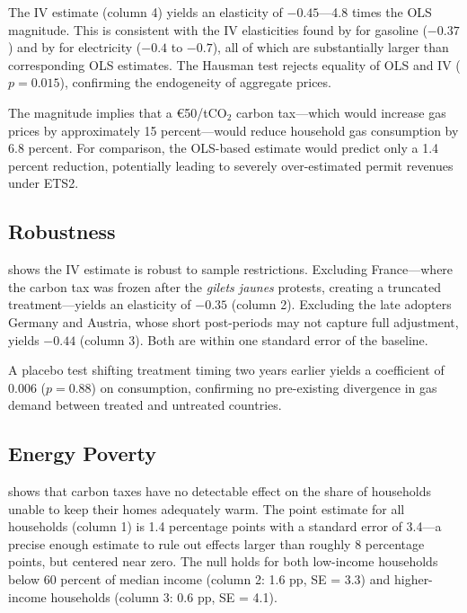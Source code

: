\documentclass[12pt]{article}
\begin{document}
The IV estimate (column 4) yields an elasticity of $-0.45$---4.8 times the OLS magnitude. This is consistent with the IV elasticities found by \citet{coglianese2017gasoline} for gasoline ($-0.37$) and by \citet{ito2014sequential} for electricity ($-0.4$ to $-0.7$), all of which are substantially larger than corresponding OLS estimates. The Hausman test rejects equality of OLS and IV ($p = 0.015$), confirming the endogeneity of aggregate prices.



The magnitude implies that a \euro{}50/tCO$_2$ carbon tax---which would increase gas prices by approximately 15 percent---would reduce household gas consumption by 6.8 percent. For comparison, the OLS-based estimate would predict only a 1.4 percent reduction, potentially leading to severely over-estimated permit revenues under ETS2.

\subsection{Robustness}

 shows the IV estimate is robust to sample restrictions. Excluding France---where the carbon tax was frozen after the \textit{gilets jaunes} protests, creating a truncated treatment---yields an elasticity of $-0.35$ (column 2). Excluding the late adopters Germany and Austria, whose short post-periods may not capture full adjustment, yields $-0.44$ (column 3). Both are within one standard error of the baseline.

A placebo test shifting treatment timing two years earlier yields a coefficient of 0.006 ($p = 0.88$) on consumption, confirming no pre-existing divergence in gas demand between treated and untreated countries.



\subsection{Energy Poverty}

 shows that carbon taxes have no detectable effect on the share of households unable to keep their homes adequately warm. The point estimate for all households (column 1) is 1.4 percentage points with a standard error of 3.4---a precise enough estimate to rule out effects larger than roughly 8 percentage points, but centered near zero. The null holds for both low-income households below 60 percent of median income (column 2: 1.6 pp, SE = 3.3) and higher-income households (column 3: 0.6 pp, SE = 4.1).
\end{document}
